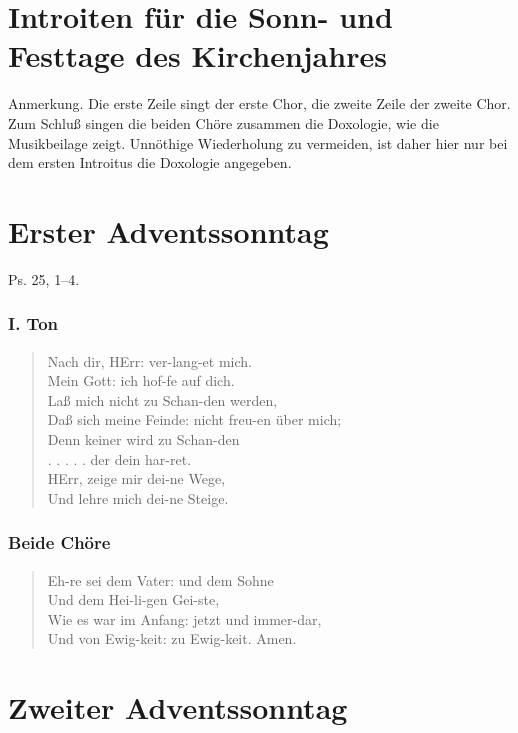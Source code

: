 \section[Introiten für die Sonn- und Festtage]{Introiten für die Sonn- und Festtage des Kirchenjahres}

Anmerkung. Die erste Zeile singt der erste Chor, die zweite Zeile der zweite Chor. Zum Schluß singen die beiden Chöre zusammen die Doxologie, wie die Musikbeilage zeigt. Unnöthige Wiederholung zu vermeiden, ist daher hier nur bei dem ersten Introitus die Doxologie angegeben.

\section{Erster Adventssonntag}

Ps. 25, 1–4.

\subsubsection{I. Ton}
\begin{verse}
Nach dir, HErr: ver-lang-et mich.\\
Mein Gott: ich hof-fe auf dich.\\
Laß mich nicht zu Schan-den werden,\\
Daß sich meine Feinde: nicht freu-en über mich;\\
Denn keiner wird zu Schan-den\\
. . . . . der dein har-ret.\\
HErr, zeige mir dei-ne Wege,\\
Und lehre mich dei-ne Steige.
\end{verse}

\subsubsection{Beide Chöre}
\begin{verse}
Eh-re sei dem Vater: und dem Sohne\\
Und dem Hei-li-gen Gei-ste,\\
Wie es war im Anfang: jetzt und immer-dar,\\
Und von Ewig-keit: zu Ewig-keit. Amen.
\end{verse}

\section{Zweiter Adventssonntag}

